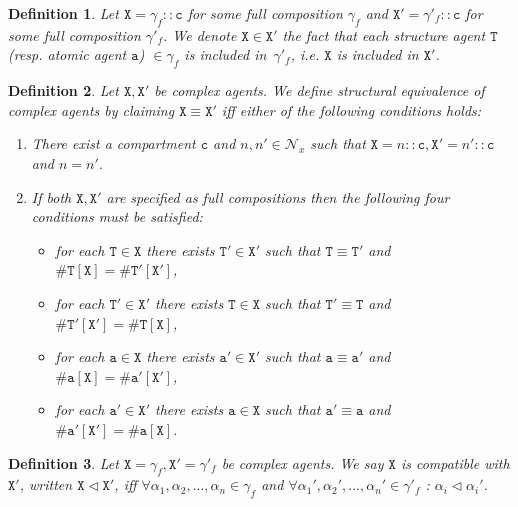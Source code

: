 \documentclass[12pt]{article}
\newtheorem{mydef}{Definition}
\begin{document}
\begin{mydef}
Let $\mathtt{X}=\gamma_f::\mathtt{c}$ for some full composition $\gamma_f$ and $\mathtt{X}'=\gamma'_f::\mathtt{c}$ for some full composition $\gamma'_f$. We denote $\mathtt{X} \in \mathtt{X}'$ the fact that each structure agent $\mathtt{T}$ (resp. atomic agent $\mathtt{a}$) $\in \gamma_f$ is included in~$\gamma'_f$, i.e. $\mathtt{X}$ is included in $\mathtt{X}'$.
\end{mydef}

\begin{mydef}
Let $\mathtt{X},\mathtt{X}'$ be complex agents. We define \emph{structural equivalence} of \emph{complex agents} by claiming $\mathtt{X}\equiv\mathtt{X}'$ iff either of the following conditions holds:
\begin{enumerate}
\item There exist a compartment $\mathtt{c}$ and $n,n'\in\mathcal{N}_x$ such that $\mathtt{X}=n::\mathtt{c},\mathtt{X}'=n'::\mathtt{c}$ and $n=n'$.
\item If both $\mathtt{X},\mathtt{X}'$ are specified as full compositions then the following four conditions must be satisfied:

\begin{itemize}
\item for each $\mathtt{T}\in\mathtt{X}$ there exists $\mathtt{T}'\in\mathtt{X}'$ such that $\mathtt{T}\equiv\mathtt{T}'$ and $\#\mathtt{T}[\mathtt{X}]=\#\mathtt{T}'[\mathtt{X}']$,
\item for each $\mathtt{T}'\in\mathtt{X}'$ there exists $\mathtt{T}\in\mathtt{X}$ such that $\mathtt{T}'\equiv\mathtt{T}$ and $\#\mathtt{T}'[\mathtt{X}']=\#\mathtt{T}[\mathtt{X}]$,
\item for each $\mathtt{a}\in\mathtt{X}$ there exists $\mathtt{a}'\in\mathtt{X}'$ such that $\mathtt{a}\equiv\mathtt{a}'$ and $\#\mathtt{a}[\mathtt{X}]=\#\mathtt{a}'[\mathtt{X}']$,
\item for each $\mathtt{a}'\in\mathtt{X}'$ there exists $\mathtt{a}\in\mathtt{X}$ such that $\mathtt{a}'\equiv\mathtt{a}$ and $\#\mathtt{a}'[\mathtt{X}']=\#\mathtt{a}[\mathtt{X}]$.
\end{itemize}

\end{enumerate}
\end{mydef}

\begin{mydef}
Let $\mathtt{X} = \gamma_f, \mathtt{X}' = \gamma'_f$ be complex agents. We say $\mathtt{X}$ \emph{is compatible with} $\mathtt{X}'$, written $\mathtt{X} \lhd \mathtt{X}'$, iff $\forall \alpha_1, \alpha_2, ..., \alpha_n \in \gamma_f $ and $\forall \alpha_1', \alpha_2', ..., \alpha_n' \in \gamma'_f$ : $\alpha_i \lhd \alpha_i'$. 
\end{mydef}
\end{document}
